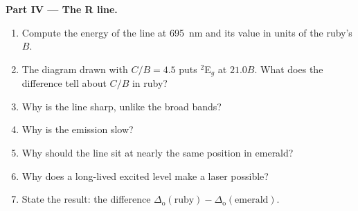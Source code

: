 \begin{problem}
\medskip\noindent\textbf{Part IV --- The R line.}
\begin{enumerate}[resume]
  \item Compute the energy of the line at \qty{695}{nm} and its value in units of the ruby's $B$.
  \item The diagram drawn with $C/B = 4.5$ puts $^2$E$_g$ at $21.0B$. What does the difference
        tell about $C/B$ in ruby?
  \item Why is the line sharp, unlike the broad bands?
  \item Why is the emission slow?
  \item Why should the line sit at nearly the same position in emerald?
  \item Why does a long-lived excited level make a laser possible?
  \item State the result: the difference $\Delta_{\mathrm o}(\text{ruby}) - \Delta_{\mathrm o}(\text{emerald})$.
\end{enumerate}
\end{problem}

